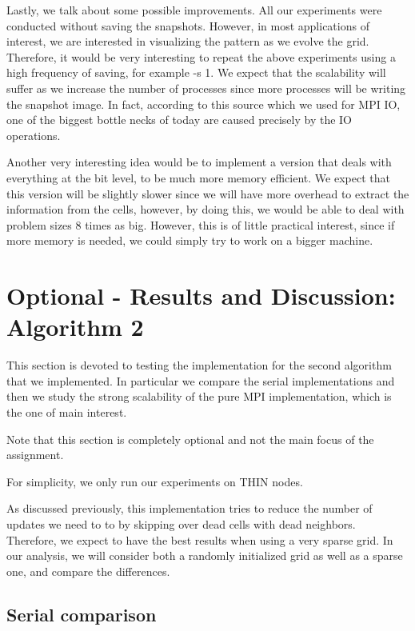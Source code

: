 \documentclass{report}
\begin{document}
Lastly, we talk about some possible improvements. All our experiments were conducted 
without saving the snapshots. However, in most applications of interest, we are interested 
in visualizing the pattern as we evolve the grid. Therefore, it would be very 
interesting to repeat the above experiments using a high frequency of saving, for 
example -s 1. We expect that the scalability will suffer as we increase the number of 
processes since more processes will be writing the snapshot image. In fact, according 
to this\cite{} source which we used for MPI IO, one of the biggest bottle necks of today 
are caused precisely by the IO operations. 

Another very interesting idea would be to implement a version that deals with everything 
at the bit level, to be much more memory efficient. We expect that this version 
will be slightly slower since we will have more overhead to extract the information 
from the cells, however, by doing this, we would be able to deal with problem sizes 
8 times as big. However, this is of little practical interest, since if more 
memory is needed, we could simply try to work on a bigger machine. 

\section{Optional - Results and Discussion: Algorithm 2}

This section is devoted to testing the implementation for the second algorithm that 
we implemented. In particular we compare the serial implementations and then 
we study the strong scalability of the pure MPI implementation, which is the one 
of main interest. 

Note that this section is completely optional and not the main focus of the assignment. 

For simplicity, we only run our experiments on THIN nodes. 

As discussed previously, this implementation tries to reduce the number of updates 
we need to to by skipping over dead cells with dead neighbors. Therefore, we expect 
to have the best results when using a very sparse grid. In our analysis, we will 
consider both a randomly initialized grid as well as a sparse one, and compare the 
differences. 

\subsection{Serial comparison}
\end{document}
